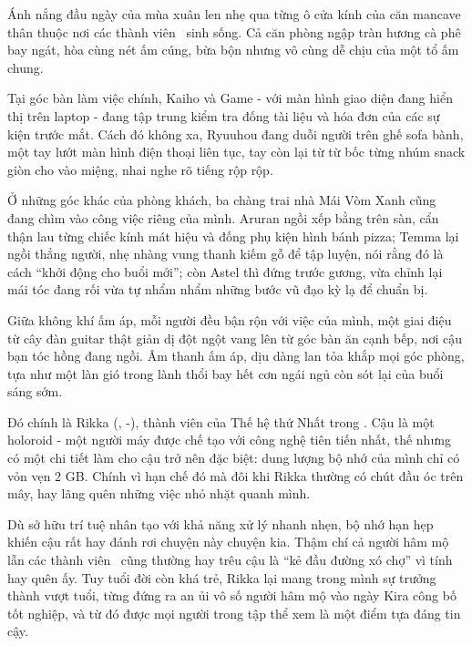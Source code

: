 \documentclass[../main.tex]{subfiles}
\begin{document}

Ánh nắng đầu ngày của mùa xuân len nhẹ qua từng ô cửa kính của căn mancave thân thuộc nơi các thành viên \hls\ sinh sống. Cả căn phòng ngập tràn hương cà phê bay ngát, hòa cùng nét ấm cúng, bừa bộn nhưng vô cùng dễ chịu của một tổ ấm chung.

Tại góc bàn làm việc chính, Kaiho và Game - với màn hình giao diện đang hiển thị trên laptop - đang tập trung kiểm tra đống tài liệu và hóa đơn của các sự kiện trước mắt. Cách đó không xa, Ryuuhou đang duỗi người trên ghế sofa bành, một tay lướt màn hình điện thoại liên tục, tay còn lại từ từ bốc từng nhúm snack giòn cho vào miệng, nhai nghe rõ tiếng rộp rộp.

Ở những góc khác của phòng khách, ba chàng trai nhà Mái Vòm Xanh cũng đang chìm vào công việc riêng của mình. Aruran ngồi xếp bằng trên sàn, cẩn thận lau từng chiếc kính mát hiệu và đống phụ kiện hình bánh pizza; Temma lại ngồi thẳng người, nhẹ nhàng vung thanh kiếm gỗ để tập luyện, nói rằng đó là cách ``khởi động cho buổi mới''; còn Astel thì đứng trước gương, vừa chỉnh lại mái tóc đang rối vừa tự nhẩm nhẩm những bước vũ đạo kỳ lạ để chuẩn bị.

Giữa không khí ấm áp, mỗi người đều bận rộn với việc của mình, một giai điệu từ cây đàn guitar thật giản dị đột ngột vang lên từ góc bàn ăn cạnh bếp, nơi cậu bạn tóc hồng đang ngồi. Âm thanh ấm áp, dịu dàng lan tỏa khắp mọi góc phòng, tựa như một làn gió trong lành thổi bay hết cơn ngái ngủ còn sót lại của buổi sáng sớm.

\chrint

Đó chính là Rikka (, -), thành viên của Thế hệ thứ Nhất trong \hls. Cậu là một holoroid - một người máy được chế tạo với công nghệ tiên tiến nhất, thế nhưng có một chi tiết làm cho cậu trở nên đặc biệt: dung lượng bộ nhớ của mình chỉ có vỏn vẹn 2 GB. Chính vì hạn chế đó mà đôi khi Rikka thường có chút đầu óc trên mây, hay lãng quên những việc nhỏ nhặt quanh mình.


Dù sở hữu trí tuệ nhân tạo với khả năng xử lý nhanh nhẹn, bộ nhớ hạn hẹp khiến cậu rất hay đánh rơi chuyện này chuyện kia. Thậm chí cả người hâm mộ lẫn các thành viên \hls\ cũng thường hay trêu cậu là ``kẻ đầu đường xó chợ'' vì tính hay quên ấy. Tuy tuổi đời còn khá trẻ, Rikka lại mang trong mình sự trưởng thành vượt tuổi, từng đứng ra an ủi vô số người hâm mộ vào ngày Kira công bố tốt nghiệp, và từ đó được mọi người trong tập thể xem là một điểm tựa đáng tin cậy.
\end{document}

